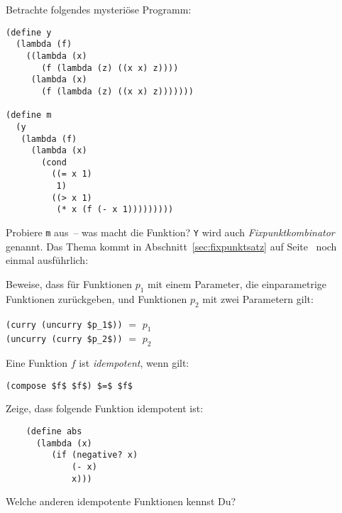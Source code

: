 \begin{aufgabe}
  Betrachte folgendes mysteriöse Programm:
  \begin{lstlisting}
(define y
  (lambda (f)
    ((lambda (x)
       (f (lambda (z) ((x x) z))))
     (lambda (x)
       (f (lambda (z) ((x x) z)))))))

(define m
  (y
   (lambda (f)
     (lambda (x)
       (cond
         ((= x 1)
          1)
         ((> x 1)
          (* x (f (- x 1)))))))))
   \end{lstlisting}
  Probiere \lstinline{m} aus~-- was macht die Funktion?  \lstinline{Y}
  wird auch \textit{Fixpunktkombinator}
  genannt.  Das Thema kommt in Abschnitt~\ref{sec:fixpunktsatz} auf
  Seite~\pageref{sec:fixpunktsatz} noch einmal ausführlich:
 \end{aufgabe}

\begin{aufgabe}
  Beweise, dass für Funktionen $p_1$ mit einem Parameter, die
  einparametrige Funktionen zurückgeben, und Funktionen $p_2$ mit zwei
  Parametern gilt:
  \begin{center}
    \lstinline{(curry (uncurry $p_1$))} $=$ $p_1$\\
    \lstinline{(uncurry (curry $p_2$))} $=$ $p_2$
  \end{center}
 \end{aufgabe}

\begin{aufgabe}
  Eine Funktion $f$ ist \textit{idempotent}, wenn gilt:

  \begin{center}
    \lstinline{(compose $f$ $f$) $=$ $f$}
  \end{center}

  Zeige, dass folgende Funktion idempotent ist:

  \begin{lstlisting}
    (define abs
      (lambda (x)
         (if (negative? x)
             (- x)
             x)))  \end{lstlisting}

  Welche anderen idempotente Funktionen kennst Du?
\end{aufgabe}

